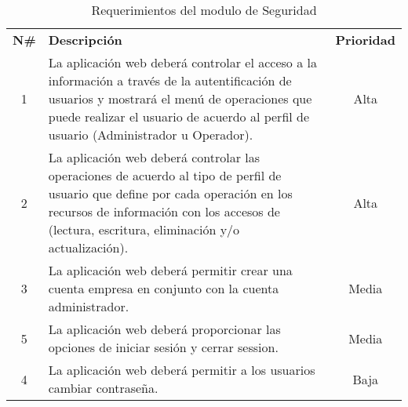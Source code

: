 \begin{table}[H]
	\centering
    \begin{tabular}{ |c|p{10cm}|c| }
	  \hline
	  \rowcolor{indigo-dark} \multicolumn{3}{|c|}{ \textcolor{white}{\textbf{Administración de Seguridad}}} \\
	  \hline
	  \rowcolor{indigo-light} \textbf{N\#} & \centering \textbf{Descripción} & \textbf{Prioridad} \\
	  \hline
	  1 & La aplicación web deberá controlar el acceso a la información a través de la autentificación de usuarios y mostrará el menú de operaciones que puede realizar el usuario de acuerdo al perfil de usuario (Administrador u Operador). & Alta\\
	  \hline
	  2 & La aplicación web deberá controlar las operaciones de acuerdo al tipo de perfil  de usuario que define por cada operación en los recursos de información con los accesos de (lectura, escritura, eliminación y/o actualización). & Alta\\
	  \hline
	  3 & La aplicación web deberá permitir crear una cuenta empresa en conjunto con la cuenta administrador. & Media \\
	  \hline
	  5 & La aplicación web deberá proporcionar las opciones de iniciar sesión y cerrar session. &  Media\\
	  \hline
	  4 & La aplicación web deberá permitir a los usuarios cambiar contraseña. &  Baja \\
	  \hline
	\end{tabular}
	\caption{Requerimientos del modulo de Seguridad}
\end{table}


